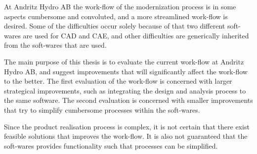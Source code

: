 At Andritz Hydro AB the work-flow of the modernization process is in some aspects cumbersome and convoluted, and a more streamlined work-flow is desired. Some of the difficulties occur solely because of that two different soft-wares are used for CAD and CAE, and other difficulties are generically inherited from the soft-wares that are used. 

The main purpose of this thesis is to evaluate the current work-flow at Andritz Hydro AB, and suggest improvements that will significantly affect the work-flow to the better. The first evaluation of the work-flow is concerned with larger strategical improvements, such as integrating the design and analysis process to the same software. The second evaluation is concerned with smaller improvements that try to simplify cumbersome processes within the soft-wares.

Since the product realisation process is complex, it is not certain that there exist feasible solutions that improves the work-flow. It is also not guaranteed that the soft-wares provides functionality such that processes can be simplified.


